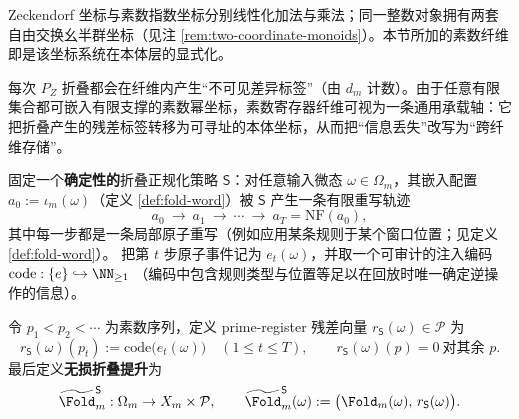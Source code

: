 \begin{remark}[两套自由交换幺半群坐标的并存]\label{rem:pom-two-monoids}
Zeckendorf 坐标与素数指数坐标分别线性化加法与乘法；同一整数对象拥有两套自由交换幺半群坐标（见注 \ref{rem:two-coordinate-monoids}）。本节所加的素数纤维即是该坐标系统在本体层的显式化。
\end{remark}

\begin{remark}[折叠残差的素数承载]\label{rem:pom-prime-carry}
每次 $P_Z$ 折叠都会在纤维内产生“不可见差异标签”（由 $d_m$ 计数）。由于任意有限集合都可嵌入有限支撑的素数幂坐标，素数寄存器纤维可视为一条通用承载轴：它把折叠产生的残差标签转移为可寻址的本体坐标，从而把“信息丢失”改写为“跨纤维存储”。
\end{remark}

\begin{definition}\label{def:pom-fold-prime-lift}
固定一个\textbf{确定性的}折叠正规化策略 \(\mathsf{S}\)：对任意输入微态 \(\omega\in\Omega_m\)，其嵌入配置 \(a_0:=\iota_m(\omega)\)（定义 \ref{def:fold-word}）被 \(\mathsf{S}\) 产生一条有限重写轨迹
\[
a_0\ \to\ a_1\ \to\ \cdots\ \to\ a_T=\mathrm{NF}(a_0),
\]
其中每一步都是一条局部原子重写（例如应用某条规则于某个窗口位置；见定义 \ref{def:fold-word}）。
把第 \(t\) 步原子事件记为 \(e_t(\omega)\)，并取一个可审计的注入编码
\(
\mathrm{code}:\{e\}\hookrightarrow\NN_{\ge 1}
\)
（编码中包含规则类型与位置等足以在回放时唯一确定逆操作的信息）。
\par
令 \(p_1<p_2<\cdots\) 为素数序列，定义 prime-register 残差向量 \(r_{\mathsf S}(\omega)\in\mathcal P\) 为
\[
r_{\mathsf S}(\omega)(p_t):=\mathrm{code}\bigl(e_t(\omega)\bigr)\quad(1\le t\le T),
\qquad
r_{\mathsf S}(\omega)(p)=0\ \text{对其余 }p.
\]
最后定义\textbf{无损折叠提升}为
\[
\widetilde{\Fold}^{\mathsf S}_m:\Omega_m\to X_m\times\mathcal P,
\qquad
\widetilde{\Fold}^{\mathsf S}_m(\omega):=\bigl(\Fold_m(\omega),\,r_{\mathsf S}(\omega)\bigr).
\]
\end{definition}


